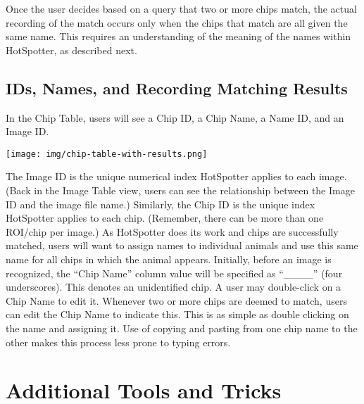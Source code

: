 \documentclass[a4paper,10pt]{article}
\begin{document}
\noindent
  Once the user decides based on a query that two or more chips match,
  the actual recording of the match occurs only when the chips that
  match are all given the same name.  This requires an understanding
  of the meaning of the names within HotSpotter, as described next.

   \subsection{IDs, Names, and Recording Matching Results}

   In the Chip Table, users will see a Chip ID, a Chip Name, a Name
   ID, and an Image ID.

\begin{center}
  \texttt{[image: img/chip-table-with-results.png]}
\end{center}

\noindent
  The Image ID is the unique numerical index HotSpotter applies to
  each image.  (Back in the Image Table view, users can see the
  relationship between the Image ID and the image file name.)
  Similarly, the Chip ID is the unique index HotSpotter applies to
  each chip.  (Remember, there can be more than one ROI/chip per image.)
  As HotSpotter does its work and chips are successfully matched,
  users will want to assign names to individual animals and use this
  same name for all chips in which the animal appears.  Initially,
  before an image is recognized, the ``Chip Name'' column value will
  be specified as ``\_\_\_\_'' (four underscores).  This denotes an
  unidentified chip.  A user may double-click on a Chip Name to edit
  it.  Whenever two or more chips are deemed to match, users can edit
  the Chip Name to indicate this.  This is as simple as double
  clicking on the name and assigning it.  Use of copying and pasting
  from one chip name to the other makes this process less prone to
  typing errors.

\section{Additional Tools and Tricks}
\end{document}
